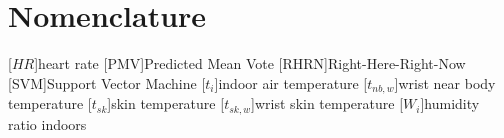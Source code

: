 \section*{Nomenclature}
\renewcommand{\baselinestretch}{0.75}\normalsize
\renewcommand{\aclabelfont}[1]{\textsc{\acsfont{#1}}}
\begin{acronym}[longest]

    [$\mathit{HR}$]{heart rate}
    [PMV]{Predicted Mean Vote}
    [RHRN]{Right-Here-Right-Now}
    [SVM]{Support Vector Machine}
    [$t_{i}$]{indoor air temperature}
    [$t_{nb,w}$]{wrist near body temperature}
    [$t_{sk}$]{skin temperature}
    [$t_{sk,w}$]{wrist skin temperature}
    [$W_{i}$]{humidity ratio indoors}

\end{acronym}
\renewcommand{\baselinestretch}{1}\normalsize